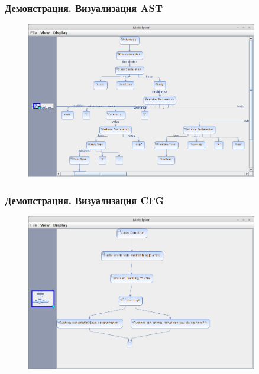 \documentclass{beamer}
\begin{document}
\begin{frame}
\frametitle{Демонстрация. Визуализация AST}

\begin{figure}[h]
    \begin{center}
        \includegraphics[width=0.9\textwidth]{../fig/ast_test1.png}
    \end{center}
\end{figure}

\end{frame}
\begin{frame}
\frametitle{Демонстрация. Визуализация CFG}

\begin{figure}[h]
    \begin{center}
        \includegraphics[width=0.9\textwidth]{../fig/cfg_test1.png}
    \end{center}
\end{figure}

\end{frame}
\end{document}
